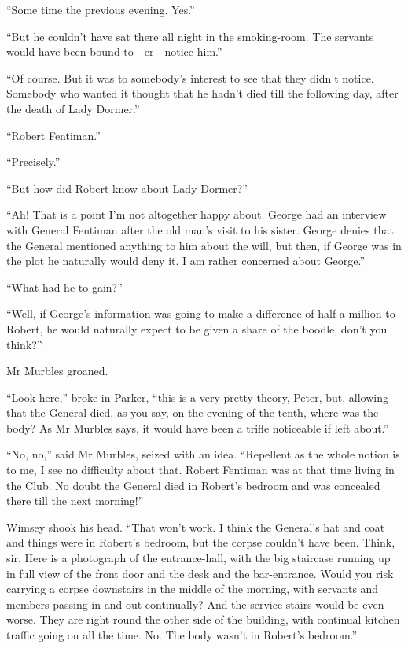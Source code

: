 \enquote{Some time the previous evening. Yes.}

\enquote{But he couldn't have sat there all night in the smoking-room. The servants would have been bound to\allowbreak---\allowbreak er---notice him.}

\enquote{Of course. But it was to somebody's interest to see that they didn't notice. Somebody who wanted it thought that he hadn't died till the following day, after the death of Lady Dormer.}

\enquote{Robert Fentiman.}

\enquote{Precisely.}

\enquote{But how did Robert know about Lady Dormer?}

\enquote{Ah! That is a point I'm not altogether happy about. George had an interview with General Fentiman after the old man's visit to his sister. George denies that the General mentioned anything to him about the will, but then, if George was in the plot he naturally would deny it. I am rather concerned about George.}

\enquote{What had he to gain?}

\enquote{Well, if George's information was going to make a difference of half a million to Robert, he would naturally expect to be given a share of the boodle, don't you think?}

Mr Murbles groaned.

\enquote{Look here,} broke in Parker, \enquote{this is a very pretty theory, Peter, but, allowing that the General died, as you say, on the evening of the tenth, where was the body? As Mr Murbles says, it would have been a trifle noticeable if left about.}

\enquote{No, no,} said Mr Murbles, seized with an idea. \enquote{Repellent as the whole notion is to me, I see no difficulty about that. Robert Fentiman was at that time living in the Club. No doubt the General died in Robert's bedroom and was concealed there till the next morning!}

Wimsey shook his head. \enquote{That won't work. I think the General's hat and coat and things were in Robert's bedroom, but the corpse couldn't have been. Think, sir. Here is a photograph of the entrance-hall, with the big staircase running up in full view of the front door and the desk and the bar-entrance. Would you risk carrying a corpse downstairs in the middle of the morning, with servants and members passing in and out continually? And the service stairs would be even worse. They are right round the other side of the building, with continual kitchen traffic going on all the time. No. The body wasn't in Robert's bedroom.}

